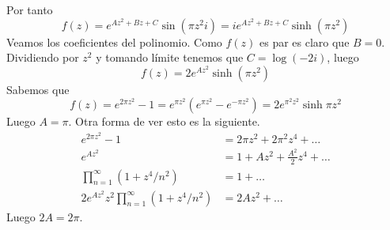 \documentclass[twoside]{article}
\begin{document}
\begin{solucion}
\begin{enumerate}[a)]
$$$$
Por tanto
$$
f(z) = e^{Az^2+Bz+C}\sin(\pi z^2i) = ie^{Az^2+Bz+C}\sinh(\pi z^2)  
$$
Veamos los coeficientes del polinomio. Como $f(z)$ es par es claro que $B=0$. Dividiendo por $z^2$ y tomando límite tenemos que $C=\log (-2i)$, luego
$$
f(z)=2 e^{Az^2}\sinh(\pi z^2) 
$$
Sabemos que
$$
f(z)=e^{2\pi z^2} -1 = e^{\pi z^2}(e^{\pi z^2}-e^{-\pi z^2}) = 2e^{\pi^2 z^2} \sinh \pi z^2
$$
Luego $A=\pi$. Otra forma de ver esto es la siguiente.
\begin{align*}
e^{2\pi z^2} -1 &= 2\pi z^2 + 2\pi^2 z^4 + \dotsc\\
e^{Az^2} &= 1 + Az^2 + \frac{A^2}{2}z^4 + \dotsc\\
\prod_{n=1}^\infty (1+z^4/n^2) &= 1 + \dotsc \\
2e^{Az^2}z^2  \prod_{n=1}^\infty (1+z^4/n^2) &= 2Az^2 + \dotsc
\end{align*}
Luego $2A = 2\pi$.
\end{enumerate}
\end{solucion}

\newpage
\end{document}
